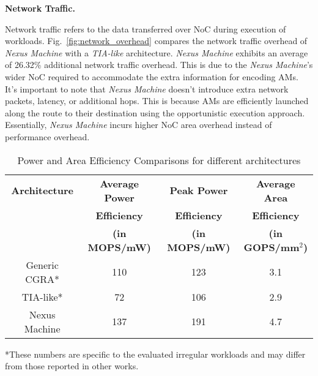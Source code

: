{\bf Network Traffic.}
\iffalse
Network traffic refers to the data transferred during the execution of workloads.
Figure~\ref{fig:network_overhead} illustrates the network traffic overhead of Nexus Machine in comparison to TIA-like architecture.
Nexus Machine experiences an average of 13.89\% additional network traffic overhead. Note that this is due to the wider NoC of Nexus, to accommodate the additional information needed to encode AMs; There is no extra network packets in Nexus, nor any additional network latency or unnecessary hop count, as AMs are launched along the way to the destination with Nexus Machine's lazy execution. In other words, Nexus incurs higher NoC area overhead, instead of performance overhead.
\fi
Network traffic refers to the data transferred over NoC during execution of workloads.
Fig.~\ref{fig:network_overhead} compares the network traffic overhead of \textit{Nexus Machine} with a \textit{TIA-like} architecture.
\textit{Nexus Machine} exhibits an average of 26.32\% additional network traffic overhead.
This is due to the \textit{Nexus Machine}'s wider NoC required to accommodate the extra information for encoding AMs.
It's important to note that \textit{Nexus Machine} doesn't introduce extra network packets, latency, or additional hops. 
This is because AMs are efficiently launched along the route to their destination using the opportunistic execution approach. 
Essentially, \textit{Nexus Machine} incurs higher NoC area overhead instead of performance overhead.



\begin{table}
    \centering
    \resizebox{0.95\columnwidth}{!} {
    \begin{tabular}{cccc} \hline 
         \textbf{Architecture} &   \textbf{Average Power}&\textbf{Peak Power} &\textbf{Average Area}\\
         &  \textbf{Efficiency}&\textbf{Efficiency} &\textbf{Efficiency}\\
 & \textbf{(in MOPS/mW)}&\textbf{(in MOPS/mW)} & \textbf{(in GOPS/mm$^2$)}\\ \hline
         Generic CGRA*&   110&123 &3.1\\ \hline 
         TIA-like*&   72&106 &2.9\\ \hline
 Nexus Machine& 137&191&4.7\\\hline
    \end{tabular}
    }
    \begin{flushleft}
    \tiny{*These numbers are specific to the evaluated irregular workloads and may differ from those reported in other works.}
    \end{flushleft}
    \caption{Power and Area Efficiency Comparisons for different architectures}
    \label{tab:power_efficiency}
\end{table}

